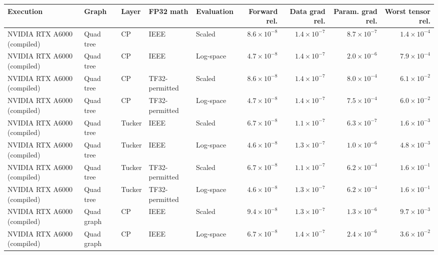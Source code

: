 \begin{tabular}{lllllrrrr}
\toprule
Execution & Graph & Layer & FP32 math & Evaluation & Forward rel. & Data grad rel. & Param. grad rel. & Worst tensor rel. \\
\midrule
NVIDIA RTX A6000 (compiled) & Quad tree & CP & IEEE & Scaled & $8.6\mathbin{\times}10^{-8}$ & $1.4\mathbin{\times}10^{-7}$ & $8.7\mathbin{\times}10^{-7}$ & $1.4\mathbin{\times}10^{-4}$ \\
NVIDIA RTX A6000 (compiled) & Quad tree & CP & IEEE & Log-space & $4.7\mathbin{\times}10^{-8}$ & $1.4\mathbin{\times}10^{-7}$ & $2.0\mathbin{\times}10^{-6}$ & $7.9\mathbin{\times}10^{-4}$ \\
NVIDIA RTX A6000 (compiled) & Quad tree & CP & TF32-permitted & Scaled & $8.6\mathbin{\times}10^{-8}$ & $1.4\mathbin{\times}10^{-7}$ & $8.0\mathbin{\times}10^{-4}$ & $6.1\mathbin{\times}10^{-2}$ \\
NVIDIA RTX A6000 (compiled) & Quad tree & CP & TF32-permitted & Log-space & $4.7\mathbin{\times}10^{-8}$ & $1.4\mathbin{\times}10^{-7}$ & $7.5\mathbin{\times}10^{-4}$ & $6.0\mathbin{\times}10^{-2}$ \\
NVIDIA RTX A6000 (compiled) & Quad tree & Tucker & IEEE & Scaled & $6.7\mathbin{\times}10^{-8}$ & $1.1\mathbin{\times}10^{-7}$ & $6.3\mathbin{\times}10^{-7}$ & $1.6\mathbin{\times}10^{-3}$ \\
NVIDIA RTX A6000 (compiled) & Quad tree & Tucker & IEEE & Log-space & $4.6\mathbin{\times}10^{-8}$ & $1.3\mathbin{\times}10^{-7}$ & $1.0\mathbin{\times}10^{-6}$ & $4.8\mathbin{\times}10^{-3}$ \\
NVIDIA RTX A6000 (compiled) & Quad tree & Tucker & TF32-permitted & Scaled & $6.7\mathbin{\times}10^{-8}$ & $1.1\mathbin{\times}10^{-7}$ & $6.2\mathbin{\times}10^{-4}$ & $1.6\mathbin{\times}10^{-1}$ \\
NVIDIA RTX A6000 (compiled) & Quad tree & Tucker & TF32-permitted & Log-space & $4.6\mathbin{\times}10^{-8}$ & $1.3\mathbin{\times}10^{-7}$ & $6.2\mathbin{\times}10^{-4}$ & $1.6\mathbin{\times}10^{-1}$ \\
NVIDIA RTX A6000 (compiled) & Quad graph & CP & IEEE & Scaled & $9.4\mathbin{\times}10^{-8}$ & $1.3\mathbin{\times}10^{-7}$ & $1.3\mathbin{\times}10^{-6}$ & $9.7\mathbin{\times}10^{-3}$ \\
NVIDIA RTX A6000 (compiled) & Quad graph & CP & IEEE & Log-space & $6.7\mathbin{\times}10^{-8}$ & $1.4\mathbin{\times}10^{-7}$ & $2.4\mathbin{\times}10^{-6}$ & $3.6\mathbin{\times}10^{-2}$ \\

\end{tabular}
